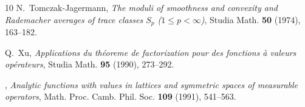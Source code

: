 \documentclass[12pt]{amsart}
\numberwithin{equation}{section}
\numberwithin{theorem}{section}
\begin{document}
\begin{thebibliography}{10}
N.~{Tomczak-Jagermann}, \emph{{\it The moduli of smoothness and convexity and
  Rademacher averages of trace classes $S_p$ ($1\le p <\infty$)}}, {\rm Studia
  Math.} \textbf{{\bf 50}} (1974), 163--182.

Q.~Xu, \emph{{\it Applications du th\'eoreme de factorization pour des
  fonctions \`a valeurs op\'erateurs}}, {\rm Studia Math.} \textbf{{\bf 95}}
  (1990), 273--292.

\bysame, \emph{{\it Analytic functions with values in lattices and symmetric
  spaces of measurable operators}}, {\rm Math. Proc. Camb. Phil. Soc.}
  \textbf{{\bf 109}} (1991), 541--563.

\end{thebibliography}
\end{document}
